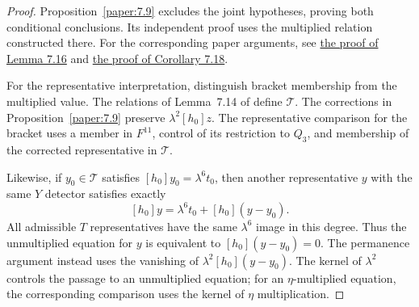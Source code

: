 \begin{proof}
Proposition~\ref{paper:7.9} excludes the joint hypotheses, proving
both conditional conclusions. Its independent proof uses the multiplied
relation constructed there. For the corresponding paper arguments, see
\href{paper/main.tex.html#L2482}{the proof of Lemma 7.16} and
\href{paper/main.tex.html#L2577}{the proof of Corollary 7.18}.

For the representative interpretation, distinguish bracket membership
from the multiplied value. The relations of Lemma~7.14 of \cite{LWX126}
define $\mathcal T$. The corrections in Proposition~\ref{paper:7.9} preserve
$\lambda^2[h_0]z$. The representative comparison for the bracket uses a
member in $F^{11}$, control of its restriction to $Q_3$, and membership
of the corrected representative in $\mathcal T$.

Likewise, if $y_0\in\mathcal T$ satisfies
$[h_0]y_0=\lambda^6t_0$, then another representative $y$ with the same
$Y$ detector satisfies exactly
\[
 [h_0]y=\lambda^6t_0+[h_0](y-y_0).
\]
All admissible $T$ representatives have the same $\lambda^6$ image in
this degree. Thus the unmultiplied equation for $y$ is equivalent to
$[h_0](y-y_0)=0$. The permanence argument instead uses the
vanishing of $\lambda^2[h_0](y-y_0)$. The kernel of $\lambda^2$ controls the passage to an unmultiplied
equation; for an $\eta$-multiplied equation, the corresponding comparison
uses the kernel of $\eta$ multiplication.
\end{proof}
